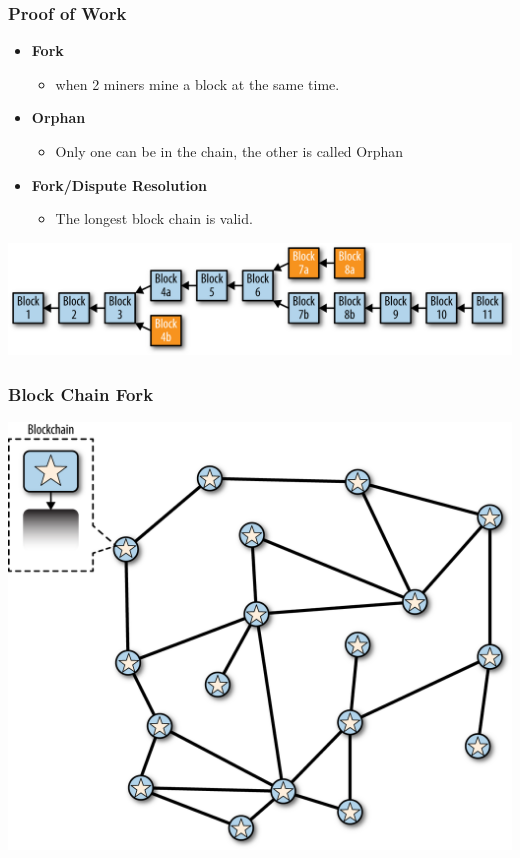 \begin{frame}
    \frametitle{Proof of Work}
    \begin{itemize}
        \item \textbf{Fork}
            \begin{itemize}
                \item when 2 miners mine a block at the same time.
            \end{itemize}
        \item \textbf{Orphan}
            \begin{itemize}
                \item Only one can be in the chain, the other is called \alert{Orphan}
            \end{itemize}
        \item \textbf{Fork/Dispute Resolution}
            \begin{itemize}
                \item The longest block chain is valid.
            \end{itemize}
    \end{itemize}
    \begin{center}
        \includegraphics[scale=0.5]{./figures/mbc2_1009.png}
    \end{center}
\end{frame}

\begin{frame}
    \frametitle{Block Chain Fork}
    \includegraphics[scale=0.7]{./figures/mbc2_1002.png}
\end{frame}

